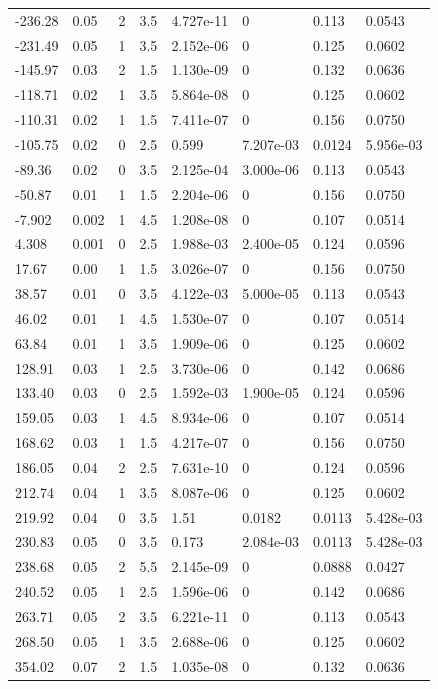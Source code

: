 \documentclass[preview]{standalone}
\begin{document}
{{\begin{tabular}{L{1.2cm}C{1.2cm} C{0.3cm}C{0.5cm} C{1.4cm}C{1.4cm} C{1.4cm}C{1.4cm}}
  -236.28  &  0.05  & 2     & 3.5 &  4.727e-11  & 0  & 0.113 &  0.0543   \\ 
  -231.49  &  0.05  & 1     & 3.5 &  2.152e-06  & 0  & 0.125 &  0.0602   \\ 
  -145.97  &  0.03  & 2     & 1.5 &  1.130e-09  & 0  & 0.132 &  0.0636   \\ 
  -118.71  &  0.02  & 1     & 3.5 &  5.864e-08  & 0  & 0.125 &  0.0602   \\ 
  -110.31  &  0.02  & 1     & 1.5 &  7.411e-07  & 0  & 0.156 &  0.0750   \\ 
  -105.75  &  0.02  & 0     & 2.5 &  0.599  & 7.207e-03  & 0.0124 &  5.956e-03   \\ 
  -89.36  &  0.02  & 0     & 3.5 &  2.125e-04  & 3.000e-06  & 0.113 &  0.0543   \\ 
  -50.87  &  0.01  & 1     & 1.5 &  2.204e-06  & 0  & 0.156 &  0.0750   \\ 
  -7.902  &  0.002  & 1     & 4.5 &  1.208e-08  & 0  & 0.107 &  0.0514   \\ 
  4.308  &  0.001  & 0     & 2.5 &  1.988e-03  & 2.400e-05  & 0.124 &  0.0596   \\ 
  17.67  &  0.00  & 1     & 1.5 &  3.026e-07  & 0  & 0.156 &  0.0750   \\ 
  38.57  &  0.01  & 0     & 3.5 &  4.122e-03  & 5.000e-05  & 0.113 &  0.0543   \\ 
  46.02  &  0.01  & 1     & 4.5 &  1.530e-07  & 0  & 0.107 &  0.0514   \\ 
  63.84  &  0.01  & 1     & 3.5 &  1.909e-06  & 0  & 0.125 &  0.0602   \\ 
  128.91  &  0.03  & 1     & 2.5 &  3.730e-06  & 0  & 0.142 &  0.0686   \\ 
  133.40  &  0.03  & 0     & 2.5 &  1.592e-03  & 1.900e-05  & 0.124 &  0.0596   \\ 
  159.05  &  0.03  & 1     & 4.5 &  8.934e-06  & 0  & 0.107 &  0.0514   \\ 
  168.62  &  0.03  & 1     & 1.5 &  4.217e-07  & 0  & 0.156 &  0.0750   \\ 
  186.05  &  0.04  & 2     & 2.5 &  7.631e-10  & 0  & 0.124 &  0.0596   \\ 
  212.74  &  0.04  & 1     & 3.5 &  8.087e-06  & 0  & 0.125 &  0.0602   \\ 
  219.92  &  0.04  & 0     & 3.5 &  1.51  & 0.0182  & 0.0113 &  5.428e-03   \\ 
  230.83  &  0.05  & 0     & 3.5 &  0.173  & 2.084e-03  & 0.0113 &  5.428e-03   \\ 
  238.68  &  0.05  & 2     & 5.5 &  2.145e-09  & 0  & 0.0888 &  0.0427   \\ 
  240.52  &  0.05  & 1     & 2.5 &  1.596e-06  & 0  & 0.142 &  0.0686   \\ 
  263.71  &  0.05  & 2     & 3.5 &  6.221e-11  & 0  & 0.113 &  0.0543   \\ 
  268.50  &  0.05  & 1     & 3.5 &  2.688e-06  & 0  & 0.125 &  0.0602   \\ 
  354.02  &  0.07  & 2     & 1.5 &  1.035e-08  & 0  & 0.132 &  0.0636   \\ 
\hline 
\end{tabular} 

}}
\end{document}
